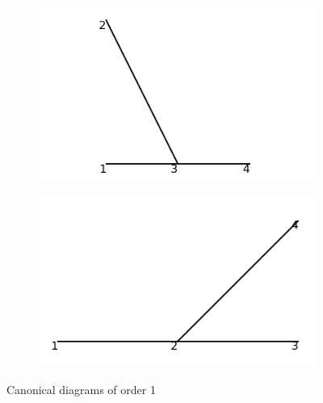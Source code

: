 \documentclass[11pt,a4paper,twoside,pdf]{article}
\numberwithin{equation}{section}
\begin{document}
\begin{figure}[h!]
    \centering
    \begin{subfigure}[t]{0.33\textwidth}
        \centering
        \includegraphics[width=\textwidth]{plots/canonical/order1/1.png}
        \caption{ }
    \end{subfigure}%
    \begin{subfigure}[t]{0.33\textwidth}
        \centering
        \includegraphics[width=\textwidth]{plots/canonical/order1/2.png}
        \caption{ }
    \end{subfigure}
    \caption{Canonical diagrams of order 1}
    \label{fig:cannonical1}
\end{figure}

\newpage
\end{document}
